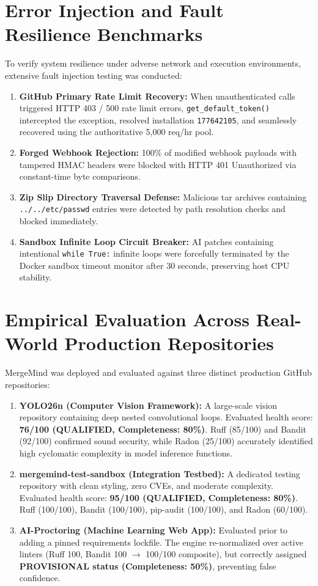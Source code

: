 \section{Error Injection and Fault Resilience Benchmarks}
\label{sec:error-injection}

To verify system resilience under adverse network and execution environments, extensive fault injection testing was conducted:

\begin{enumerate}
    \item \textbf{GitHub Primary Rate Limit Recovery:} When unauthenticated calls triggered HTTP 403 / 500 rate limit errors, \texttt{get\_default\_token()} intercepted the exception, resolved installation \texttt{177642105}, and seamlessly recovered using the authoritative 5,000 req/hr pool.
    \item \textbf{Forged Webhook Rejection:} 100\% of modified webhook payloads with tampered HMAC headers were blocked with HTTP 401 Unauthorized via constant-time byte comparisons.
    \item \textbf{Zip Slip Directory Traversal Defense:} Malicious tar archives containing \texttt{../../etc/passwd} entries were detected by path resolution checks and blocked immediately.
    \item \textbf{Sandbox Infinite Loop Circuit Breaker:} AI patches containing intentional \texttt{while True:} infinite loops were forcefully terminated by the Docker sandbox timeout monitor after 30 seconds, preserving host CPU stability.
\end{enumerate}

\section{Empirical Evaluation Across Real-World Production Repositories}
\label{sec:empirical-results}

MergeMind was deployed and evaluated against three distinct production GitHub repositories:

\begin{enumerate}
    \item \textbf{YOLO26n (Computer Vision Framework):} A large-scale vision repository containing deep nested convolutional loops. Evaluated health score: \textbf{76/100 (QUALIFIED, Completeness: 80\%)}. Ruff (85/100) and Bandit (92/100) confirmed sound security, while Radon (25/100) accurately identified high cyclomatic complexity in model inference functions.
    \item \textbf{mergemind-test-sandbox (Integration Testbed):} A dedicated testing repository with clean styling, zero CVEs, and moderate complexity. Evaluated health score: \textbf{95/100 (QUALIFIED, Completeness: 80\%)}. Ruff (100/100), Bandit (100/100), pip-audit (100/100), and Radon (60/100).
    \item \textbf{AI-Proctoring (Machine Learning Web App):} Evaluated prior to adding a pinned requirements lockfile. The engine re-normalized over active linters (Ruff 100, Bandit 100 $\to$ 100/100 composite), but correctly assigned \textbf{PROVISIONAL status (Completeness: 50\%)}, preventing false confidence.
\end{enumerate}

